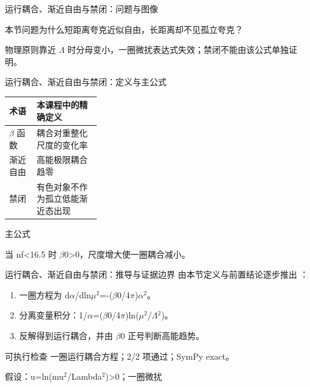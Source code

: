 \begin{frame}[t]{运行耦合、渐近自由与禁闭：问题与图像}
\footnotesize
\begin{block}{本节问题}为什么短距离夸克近似自由，长距离却不见孤立夸克？\end{block}
\begin{block}{物理原则}\quad 靠近 \ensuremath{\Lambda} 时分母变小，一圈微扰表达式失效；禁闭不能由该公式单独证明。\end{block}
\end{frame}

\begin{frame}[t]{运行耦合、渐近自由与禁闭：定义与主公式}
\footnotesize\begin{tabularx}{\linewidth}{p{0.30\linewidth}Y}
\toprule 术语 & 本课程中的精确定义\\\midrule
{} \ensuremath{\beta} 函数 & 耦合对重整化尺度的变化率\\
 渐近自由 & 高能极限耦合趋零\\
 禁闭 & 有色对象不作为孤立低能渐近态出现\\
\bottomrule\end{tabularx}\vspace{0.15cm}
\begin{block}{ 主公式}\centering{}\end{block}
当 nf<16.5 时 \ensuremath{\beta}0>0，尺度增大使一圈耦合减小。
\end{frame}

\begin{frame}[t]{运行耦合、渐近自由与禁闭：推导与证据边界}
\footnotesize
{}\quad 由本节定义与前置结论逐步推出 ：
\begin{enumerate}
\item 一圈方程为 d\ensuremath{\alpha}/\allowbreak{}dln\ensuremath{\mu}\ensuremath{^{2}}=-(\ensuremath{\beta}0/\allowbreak{}4\ensuremath{\pi})\ensuremath{\alpha}\ensuremath{^{2}}。
\item 分离变量积分：1/\allowbreak{}\ensuremath{\alpha}=(\ensuremath{\beta}0/\allowbreak{}4\ensuremath{\pi})ln(\ensuremath{\mu}\ensuremath{^{2}}/\allowbreak{}\ensuremath{\Lambda}\ensuremath{^{2}})。
\item 反解得到运行耦合，并由 \ensuremath{\beta}0 正号判断高能趋势。
\end{enumerate}\begin{block}{可执行检查}
\quad 一圈运行耦合方程；2/2 项通过；SymPy exact。
\par\scriptsize 假设：u=ln(mu\ensuremath{^{2}}/\allowbreak{}Lambda\ensuremath{^{2}})>0；一圈微扰
\end{block}
\end{frame}

